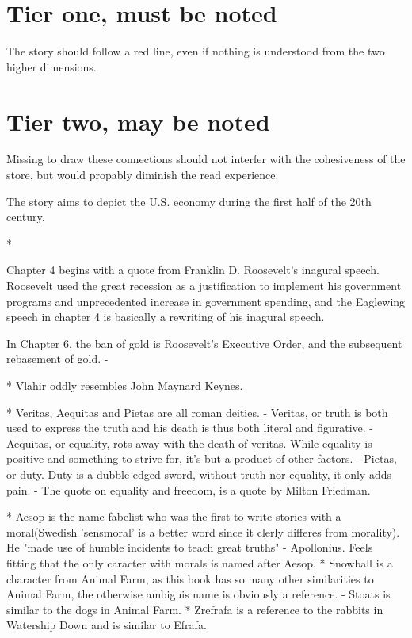 
\section{Tier one, must be noted}

The story should follow a red line, even if nothing is understood from the two higher dimensions.


\section{Tier two, may be noted}

Missing to draw these connections should not interfer with the cohesiveness of the store,
but would propably diminish the read experience.

The story aims to depict the U.S. economy during the first half of the 20th century.


* 

Chapter 4 begins with a quote from Franklin D. Roosevelt's inagural speech.
Roosevelt used the great recession as a justification to implement his government
programs and unprecedented increase in government spending, and the Eaglewing
speech in chapter 4 is basically a rewriting of his inagural speech. 


In Chapter 6, the ban of gold is Roosevelt's Executive Order, and the subsequent 
rebasement of gold.
- 

* Vlahir oddly resembles John Maynard Keynes.

* Veritas, Aequitas and Pietas are all roman deities. 
- Veritas, or truth is both used to express the truth and his death is thus both literal and figurative.
- Aequitas, or equality, rots away with the death of veritas. While equality is positive and something to strive 
for, it's but a product of other factors. 
- Pietas, or duty. Duty is a dubble-edged sword, without truth nor equality, it only adds pain.
- The quote on equality and freedom, is a quote by Milton Friedman. 


* Aesop is the name fabelist who was the first to write stories with a moral(Swedish 'sensmoral' is a better word since it clerly differes from morality). He "made use of humble incidents to teach great truths" - Apollonius. Feels fitting that the only caracter with morals is named
after Aesop.
* Snowball is a character from Animal Farm, as this book has so many other similarities to Animal Farm, the otherwise ambiguis name is obviously a reference.
- Stoats is similar to the dogs in Animal Farm.
* Zrefrafa is a reference to the rabbits in Watership Down and is similar to Efrafa.

